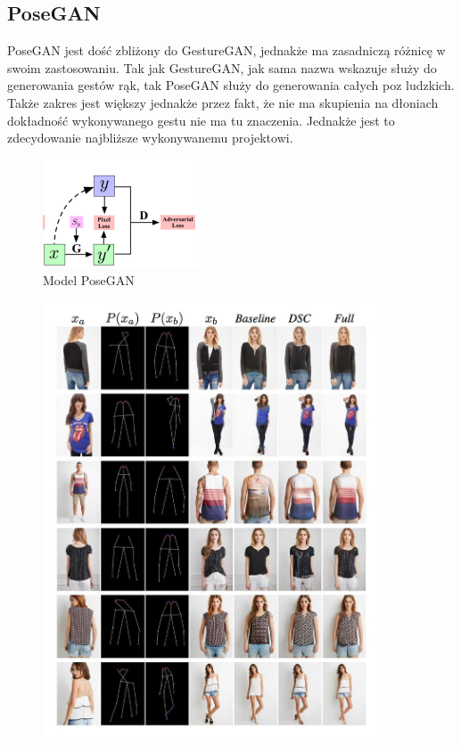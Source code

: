 \documentclass[12pt]{article}
\begin{document}
\begin{sloppypar}
{  \subsection{PoseGAN}
  {
    PoseGAN\cite{pose-gan} jest dość zbliżony do GestureGAN, jednakże ma zasadniczą różnicę w swoim zastosowaniu.
    Tak jak GestureGAN, jak sama nazwa wskazuje służy do generowania gestów rąk, tak PoseGAN służy do generowania całych poz ludzkich.
    Także zakres jest większy jednakże przez fakt, że nie ma skupienia na dłoniach dokładność wykonywanego gestu nie ma tu znaczenia.
    Jednakże jest to zdecydowanie najbliższe wykonywanemu projektowi.
    \begin{figure}[H]
      \centering
      \includegraphics{pose-gan.png}
      \caption{Model PoseGAN \cite{pose-gan}}
      \label{fig:pose-gan-budowa}
    \end{figure}
    \begin{figure}[H]
      \centering
      \includegraphics[width=0.9\textwidth]{pose-gan-ex.jpg}

\end{figure}}}
\end{sloppypar}
\end{document}
